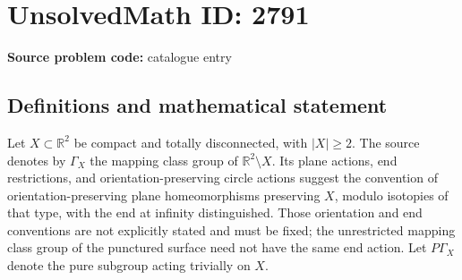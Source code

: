 \documentclass[11pt]{article}
\newcommand{\R}{\mathbb{R}}
\begin{document}
\section*{UnsolvedMath ID: 2791}
\textbf{Source problem code:} catalogue entry
\subsection{Definitions and mathematical statement}
Let $X\subset\R^2$ be compact and totally disconnected, with $|X|\geq2$. The source denotes by $\Gamma_X$ the mapping class group of $\R^2\setminus X$. Its plane actions, end restrictions, and orientation-preserving circle actions suggest the convention of orientation-preserving plane homeomorphisms preserving $X$, modulo isotopies of that type, with the end at infinity distinguished. Those orientation and end conventions are not explicitly stated and must be fixed; the unrestricted mapping class group of the punctured surface need not have the same end action. Let $P\Gamma_X$ denote the pure subgroup acting trivially on $X$.
\end{document}
